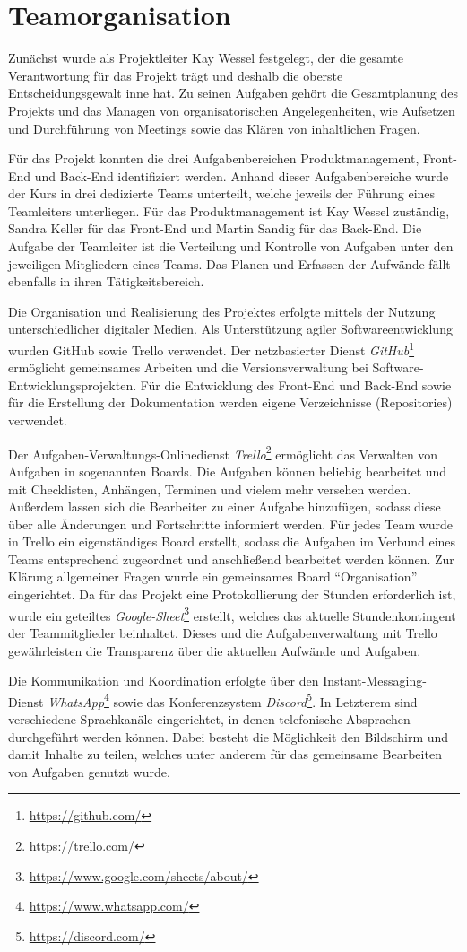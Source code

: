 \section{Teamorganisation}
\label{ch:Teamorganisation}
Zunächst wurde als Projektleiter Kay Wessel festgelegt, der die gesamte Verantwortung für das Projekt trägt und deshalb die oberste Entscheidungsgewalt inne hat. 
Zu seinen Aufgaben gehört die Gesamtplanung des Projekts und das Managen von organisatorischen Angelegenheiten, wie Aufsetzen und Durchführung von Meetings sowie das Klären von inhaltlichen Fragen.

Für das Projekt konnten die drei Aufgabenbereichen Produktmanagement, Front-End und Back-End identifiziert werden.
Anhand dieser Aufgabenbereiche wurde der Kurs in drei dedizierte Teams unterteilt, welche jeweils der Führung eines Teamleiters unterliegen.
Für das Produktmanagement ist Kay Wessel zuständig, Sandra Keller für das Front-End und Martin Sandig für das Back-End.
Die Aufgabe der Teamleiter ist die Verteilung und Kontrolle von Aufgaben unter den jeweiligen Mitgliedern eines Teams.
Das Planen und Erfassen der Aufwände fällt ebenfalls in ihren Tätigkeitsbereich.

Die Organisation und Realisierung des Projektes erfolgte mittels der Nutzung unterschiedlicher digitaler Medien.
Als Unterstützung agiler Softwareentwicklung wurden GitHub sowie Trello verwendet. 
Der netzbasierter Dienst \textit{GitHub}\footnote{\url{https://github.com/}} ermöglicht gemeinsames Arbeiten und die Versionsverwaltung bei Software-Entwicklungsprojekten. 
Für die Entwicklung des Front-End und Back-End sowie für die Erstellung der Dokumentation werden eigene Verzeichnisse (Repositories) verwendet. 

Der Aufgaben-Verwaltungs-Onlinedienst \textit{Trello}\footnote{\url{https://trello.com/}} ermöglicht das Verwalten von Aufgaben in sogenannten Boards. 
Die Aufgaben können beliebig bearbeitet und mit Checklisten, Anhängen, Terminen und vielem mehr versehen werden.
Außerdem lassen sich die Bearbeiter zu einer Aufgabe hinzufügen, sodass diese über alle Änderungen und Fortschritte informiert werden.
Für jedes Team wurde in Trello ein eigenständiges Board erstellt, sodass die Aufgaben im Verbund eines Teams entsprechend zugeordnet und anschließend bearbeitet werden können. 
Zur Klärung allgemeiner Fragen wurde ein gemeinsames Board \enquote{Organisation} eingerichtet.
Da für das Projekt eine Protokollierung der Stunden erforderlich ist, wurde ein geteiltes \textit{Google-Sheet}\footnote{\url{https://www.google.com/sheets/about/}} erstellt, welches das aktuelle Stundenkontingent der Teammitglieder beinhaltet. 
Dieses und die Aufgabenverwaltung mit Trello gewährleisten die Transparenz über die aktuellen Aufwände und Aufgaben. 

Die Kommunikation und Koordination erfolgte über den Instant-Messaging-Dienst \textit{WhatsApp}\footnote{\url{https://www.whatsapp.com/}} sowie das Konferenzsystem \textit{Discord}\footnote{\url{https://discord.com/}}.
In Letzterem sind verschiedene Sprachkanäle eingerichtet, in denen telefonische Absprachen durchgeführt werden können.
Dabei besteht die Möglichkeit den Bildschirm und damit Inhalte zu teilen, welches unter anderem für das gemeinsame Bearbeiten von Aufgaben genutzt wurde. 

